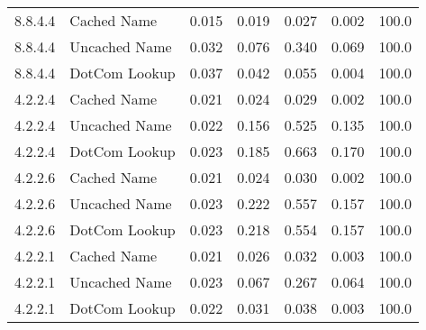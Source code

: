 \begin{table}[]
\begin{tabular}{lllllll}
8.8.4.4        & Cached Name   & 0.015 & 0.019 & 0.027 & 0.002   & 100.0    \\
8.8.4.4        & Uncached Name & 0.032 & 0.076 & 0.340 & 0.069   & 100.0    \\
8.8.4.4        & DotCom Lookup & 0.037 & 0.042 & 0.055 & 0.004   & 100.0    \\
4.2.2.4        & Cached Name   & 0.021 & 0.024 & 0.029 & 0.002   & 100.0    \\
4.2.2.4        & Uncached Name & 0.022 & 0.156 & 0.525 & 0.135   & 100.0    \\
4.2.2.4        & DotCom Lookup & 0.023 & 0.185 & 0.663 & 0.170   & 100.0    \\
4.2.2.6        & Cached Name   & 0.021 & 0.024 & 0.030 & 0.002   & 100.0    \\
4.2.2.6        & Uncached Name & 0.023 & 0.222 & 0.557 & 0.157   & 100.0    \\
4.2.2.6        & DotCom Lookup & 0.023 & 0.218 & 0.554 & 0.157   & 100.0    \\
4.2.2.1        & Cached Name   & 0.021 & 0.026 & 0.032 & 0.003   & 100.0    \\
4.2.2.1        & Uncached Name & 0.023 & 0.067 & 0.267 & 0.064   & 100.0    \\
4.2.2.1        & DotCom Lookup & 0.022 & 0.031 & 0.038 & 0.003   & 100.0    \\ \hline
\end{tabular}
\end{table}